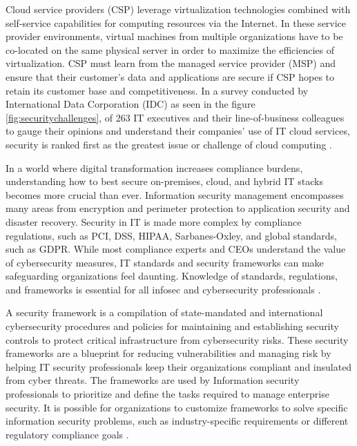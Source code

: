 {\par Cloud service providers (CSP) leverage virtualization technologies combined with self-service capabilities for computing resources via the Internet.
In these service provider environments, virtual machines from multiple organizations have to be co-located on the same physical server in order to maximize the efficiencies of virtualization.
CSP must learn from the managed service provider (MSP) and ensure that their customer’s data and applications are secure if CSP hopes to retain its customer base and competitiveness.
In a survey conducted by International Data Corporation
(IDC) as seen in the figure \ref{fig:securitychallenges},
of 263 IT executives and their line-of-business
colleagues to gauge their opinions and understand their companies’ use of IT cloud services, security is ranked first as the greatest issue or challenge of cloud computing \cite{79}.

\par In a world where digital transformation increases compliance burdens, understanding how to best secure on-premises, cloud, and hybrid IT stacks becomes more crucial than ever.
Information security management encompasses many areas from encryption and perimeter protection to application security and disaster recovery.
Security in IT is made more complex by compliance regulations, such as PCI, DSS, HIPAA, Sarbanes-Oxley, and global standards, such as GDPR. While most compliance experts and CEOs understand the value of cybersecurity measures, IT standards and security frameworks can make safeguarding organizations feel daunting.
Knowledge of standards, regulations, and frameworks is essential for all infosec and cybersecurity professionals \cite{80}.

\par A security framework is a compilation of state-mandated and international cybersecurity procedures and policies for maintaining and establishing security controls to protect critical infrastructure from cybersecurity risks.
These security frameworks are a blueprint for reducing vulnerabilities and managing risk by helping IT security professionals keep their organizations compliant and insulated from cyber threats.
The frameworks are used by Information security professionals to prioritize and define the tasks required to manage enterprise security.
It is possible for organizations to customize frameworks to solve specific information security problems, such as industry-specific requirements or different regulatory compliance goals \cite{80}.

}
